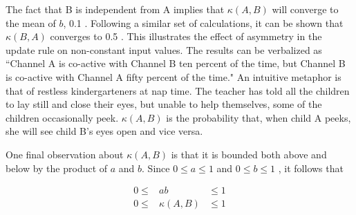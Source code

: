 The fact that B is independent from A implies that $\kappa(A, B)$ will converge to the mean of $b$, 0.1 . Following a similar set of calculations, it can be shown that $\kappa(B, A)$ converges to 0.5 . This illustrates the effect of asymmetry in the update rule on non-constant input values. The results can be verbalized as ``Channel A is co-active with Channel B ten percent of the time, but Channel B is co-active with Channel A fifty percent of the time." An intuitive metaphor is that of restless kindergarteners at nap time. The teacher has told all the children to lay still and close their eyes, but unable to help themselves, some of the children occasionally peek. $\kappa(A, B)$ is the probability that, when child A peeks, she will see child B's eyes open and vice versa.

One final observation about $\kappa(A, B)$ is that it is bounded both above and below by the product of $a$ and $b$. Since $0 \leq a \leq 1$ and $0 \leq b \leq 1$ ,  it follows that 

\begin{eqnarray}
0 \leq&ab&  \leq 1 \\
0 \leq&\kappa(A, B)&  \leq 1 
\end{eqnarray}

